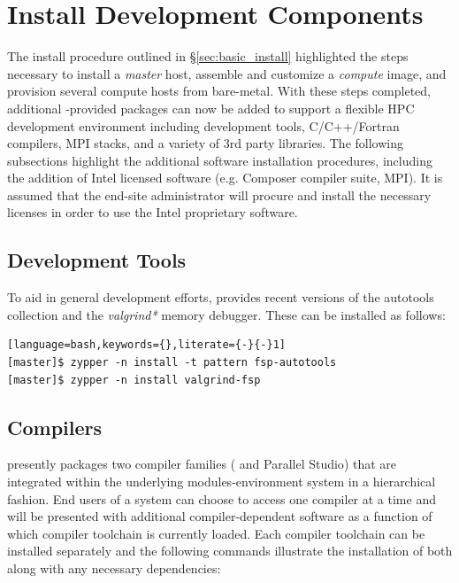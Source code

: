 \documentclass[letterpaper]{article}
\begin{document}
\section{Install \FSP{} Development Components}

The install procedure outlined in \S\ref{sec:basic_install}
highlighted the steps necessary to install a {\em master} host,
assemble and customize a {\em compute} image, and provision several
compute hosts from bare-metal.  With these steps completed, 
additional \FSP{}-provided packages can now be added to support a flexible HPC
development environment including development tools, C/C++/Fortran compilers,
MPI stacks, and a variety of 3rd party libraries. The following subsections
highlight the additional software installation procedures, including the
addition of Intel licensed software (e.g. Composer compiler suite, \Intel{}
MPI). It is assumed that the end-site administrator will procure and install
the necessary licenses in order to use the Intel proprietary software.

\subsection{Development Tools}

To aid in general development efforts, \FSP{} provides recent versions of the \GNU{}
autotools collection and the {\em valgrind*} memory debugger. These can be installed as follows:

\begin{lstlisting}[language=bash,keywords={},literate={-}{-}1]
[master]$ zypper -n install -t pattern fsp-autotools
[master]$ zypper -n install valgrind-fsp
\end{lstlisting}

\subsection{Compilers}

\FSP{} presently packages two compiler families ({\GNU{}} and {\Intel{}
  Parallel Studio}) that are integrated within the underlying
modules-environment system in a hierarchical fashion. End users of a \FSP{}
system can choose to access one compiler at a time and will be presented with
additional compiler-dependent software as a function of which compiler
toolchain is currently loaded. Each compiler toolchain can be installed
separately and the following commands illustrate the installation of both along
with any necessary dependencies:
\end{document}
